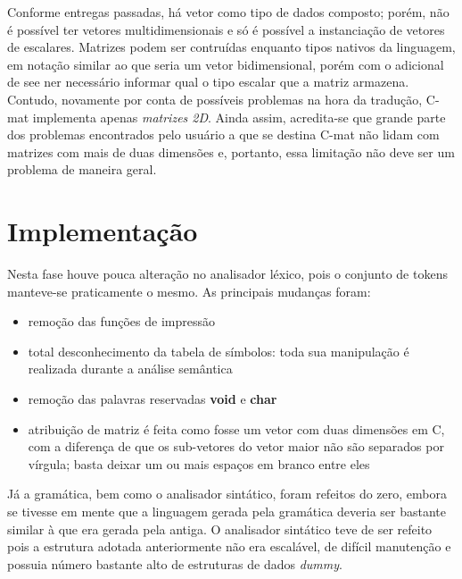 \documentclass[
	article,			%
	11pt,				%
	oneside,			%
	a4paper,			%
	english,			%
	brazil,				%
	sumario=tradicional
	]{abntex2}
\renewcommand{\it}[1]{\textit{#1}}
\renewcommand{\bf}[1]{\textbf{#1}}
\begin{document}
Conforme entregas passadas, há vetor como tipo de dados composto; porém, não é possível ter vetores multidimensionais e só é possível a instanciação de vetores de escalares. Matrizes podem ser contruídas
enquanto tipos nativos da linguagem, em notação similar ao que seria um vetor bidimensional, porém com o
adicional de see ner necessário informar qual o tipo escalar que a matriz armazena. Contudo, novamente por conta de
possíveis problemas na hora da tradução, C-mat implementa apenas \it{matrizes 2D}. Ainda assim,
acredita-se que grande parte dos problemas encontrados pelo usuário a que se destina C-mat não lidam com
matrizes com mais de duas dimensões e, portanto, essa limitação não deve ser um problema de maneira
geral.

\section{Implementação}
\label{implementacao}

Nesta fase houve pouca alteração no analisador léxico, pois o conjunto de tokens manteve-se praticamente o mesmo. As principais mudanças foram:
\begin{itemize}
	\item remoção das funções de impressão
	\item total desconhecimento da tabela de símbolos: toda sua manipulação é realizada durante a análise semântica
	\item remoção das palavras reservadas \bf{void} e \bf{char}
	\item atribuição de matriz é feita como fosse um vetor com duas dimensões em C, com a diferença de que os sub-vetores do vetor maior não são separados por vírgula; basta deixar um ou mais espaços em branco entre eles
\end{itemize}

Já a gramática, bem como o analisador sintático, foram refeitos do zero, 
embora se tivesse em mente que a linguagem gerada pela gramática deveria ser bastante similar à que era gerada pela antiga. O analisador sintático teve de ser refeito pois a estrutura adotada 
anteriormente não era escalável, de difícil manutenção e possuia número bastante alto de estruturas de dados \it{dummy}.
\end{document}

